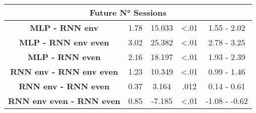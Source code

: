 \begin{table}[h]
\begin{tabular}{ccccc}
\multicolumn{5}{c}{\textbf{Future N° Sessions}}                                                                      \\ \hline
\textbf{MLP - RNN env} & 1.78                & 15.033     & \textless .01   & 1.55 - 2.02                    \\
\textbf{MLP - RNN env even}           & 3.02                & 25.382     & \textless .01   & 2.78 - 3.25                    \\
\textbf{MLP - RNN even}           & 2.16               & 18.197     & \textless .01   & 1.93 - 2.39                     \\
\textbf{RNN env - RNN env even}           & 1.23                & 10.349     & \textless .01   & 0.99 - 1.46                     \\
\textbf{RNN env - RNN even}           & 0.37                & 3.164     &   .012   & 0.14 - 0.61                     \\
\textbf{RNN env even - RNN even}          & 0.85                & -7.185     & \textless .01   & -1.08 - -0.62                    \\ \hline

\end{tabular}
\end{table}